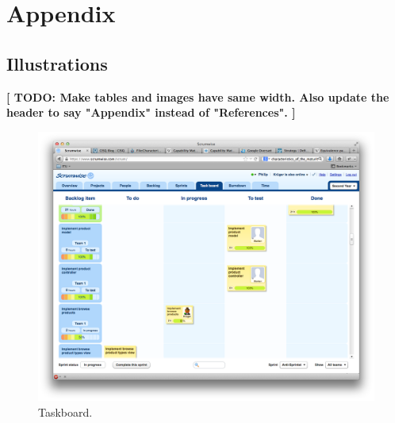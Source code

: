 \section*{Appendix}
\renewcommand*\thesubsection{\Roman{subsection}} %
\subsection{Illustrations} \label{illustrations}


\textbf{[ TODO: Make tables and images have same width. Also update the header to say "Appendix" instead of "References". ]}

\begin{figure}[H]
  \centering
  \includegraphics[width=\textwidth]{illustrations/taskboard}
  \caption{Taskboard.}
  \label{taskboard}
\end{figure}

